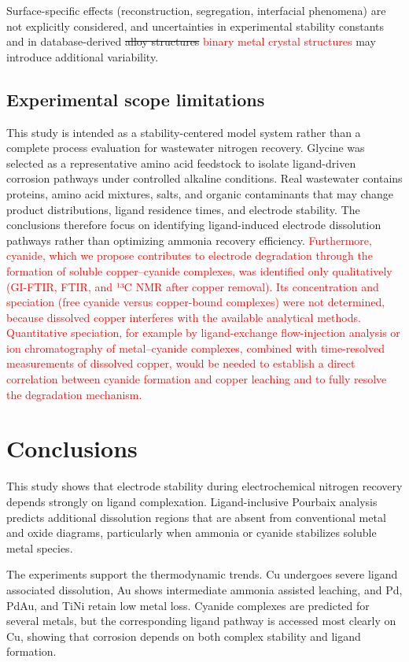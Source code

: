 \documentclass[twoside,twocolumn,9pt]{article}
\begin{document}
Surface-specific effects (reconstruction, segregation, interfacial phenomena) are not explicitly considered, and uncertainties in experimental stability constants and in database-derived \sout{alloy structures} \textcolor{red}{binary metal crystal structures} may introduce additional variability. 

\subsection{Experimental scope limitations}
This study is intended as a stability-centered model system rather than a complete process evaluation for wastewater nitrogen recovery. Glycine was selected as a representative amino acid feedstock to isolate ligand-driven corrosion pathways under controlled alkaline conditions. Real wastewater contains proteins, amino acid mixtures, salts, and organic contaminants that may change product distributions, ligand residence times, and electrode stability. The conclusions therefore focus on identifying ligand-induced electrode dissolution pathways rather than optimizing ammonia recovery efficiency. \textcolor{red}{ Furthermore, cyanide, which we propose contributes to electrode degradation through the formation of soluble copper–cyanide complexes, was identified only qualitatively (GI-FTIR, FTIR, and ¹³C NMR after copper removal). Its concentration and speciation (free cyanide versus copper-bound complexes) were not determined, because dissolved copper interferes with the available analytical methods. Quantitative speciation, for example by ligand-exchange flow-injection analysis or ion chromatography of metal–cyanide complexes, combined with time-resolved measurements of dissolved copper, would be needed to establish a direct correlation between cyanide formation and copper leaching and to fully resolve the degradation mechanism.}

\section*{Conclusions}
This study shows that electrode stability during electrochemical nitrogen recovery depends strongly on ligand complexation. Ligand-inclusive Pourbaix analysis predicts additional dissolution regions that are absent from conventional metal and oxide diagrams, particularly when ammonia or cyanide stabilizes soluble metal species.

The experiments support the thermodynamic trends. Cu undergoes severe ligand associated dissolution, Au shows intermediate ammonia assisted leaching, and Pd, PdAu, and TiNi retain low metal loss. Cyanide complexes are predicted for several metals, but the corresponding ligand pathway is accessed most clearly on Cu, showing that corrosion depends on both complex stability and ligand formation.
\end{document}
